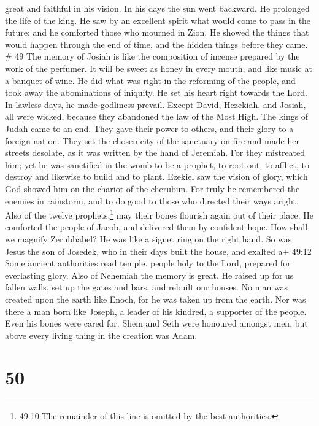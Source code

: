 great and faithful in his vision.  In his days the sun went
backward. He prolonged the life of the king.  He saw by an
excellent spirit what would come to pass in the future; and he comforted
those who mourned in Zion.  He showed the things that would
happen through the end of time, and the hidden things before they came.
\# 49  The memory of Josiah is like the composition of
incense prepared by the work of the perfumer. It will be sweet as honey
in every mouth, and like music at a banquet of wine.  He did
what was right in the reforming of the people, and took away the
abominations of iniquity.  He set his heart right towards
the Lord. In lawless days, he made godliness prevail. 
Except David, Hezekiah, and Josiah, all were wicked, because they
abandoned the law of the Most High. The kings of Judah came to an end.
 They gave their power to others, and their glory to a
foreign nation.  They set the chosen city of the sanctuary
on fire and made her streets desolate, as it was written by the hand of
Jeremiah.  For they mistreated him; yet he was sanctified in
the womb to be a prophet, to root out, to afflict, to destroy and
likewise to build and to plant.  Ezekiel saw the vision of
glory, which God showed him on the chariot of the cherubim. 
For truly he remembered the enemies in rainstorm, and to do good to
those who directed their ways aright.  Also of the twelve
prophets,\footnote{49:10 The remainder of this line is omitted by the
  best authorities.} may their bones flourish again out of their place.
He comforted the people of Jacob, and delivered them by confident hope.
 How shall we magnify Zerubbabel? He was like a signet ring
on the right hand.  So was Jesus the son of Josedek, who in
their days built the house, and exalted a+ 49:12 Some ancient
authorities read temple. people holy to the Lord, prepared for
everlasting glory.  Also of Nehemiah the memory is great.
He raised up for us fallen walls, set up the gates and bars, and rebuilt
our houses.  No man was created upon the earth like Enoch,
for he was taken up from the earth.  Nor was there a man
born like Joseph, a leader of his kindred, a supporter of the people.
Even his bones were cared for.  Shem and Seth were honoured
amongst men, but above every living thing in the creation was Adam.

\hypertarget{section-35}{%
\section{50}\label{section-35}}

